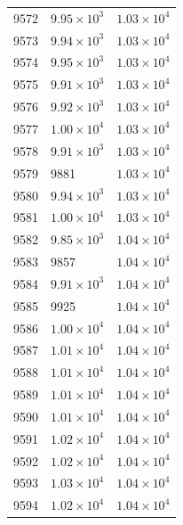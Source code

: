 \begin{table}[H]
\begin{tabular}{lll}
9572 & $\displaystyle 9.95 \times 10^{3}$ & $\displaystyle 1.03 \times 10^{4}$ \\
9573 & $\displaystyle 9.94 \times 10^{3}$ & $\displaystyle 1.03 \times 10^{4}$ \\
9574 & $\displaystyle 9.95 \times 10^{3}$ & $\displaystyle 1.03 \times 10^{4}$ \\
9575 & $\displaystyle 9.91 \times 10^{3}$ & $\displaystyle 1.03 \times 10^{4}$ \\
9576 & $\displaystyle 9.92 \times 10^{3}$ & $\displaystyle 1.03 \times 10^{4}$ \\
9577 & $\displaystyle 1.00 \times 10^{4}$ & $\displaystyle 1.03 \times 10^{4}$ \\
9578 & $\displaystyle 9.91 \times 10^{3}$ & $\displaystyle 1.03 \times 10^{4}$ \\
9579 & 9881 & $\displaystyle 1.03 \times 10^{4}$ \\
9580 & $\displaystyle 9.94 \times 10^{3}$ & $\displaystyle 1.03 \times 10^{4}$ \\
9581 & $\displaystyle 1.00 \times 10^{4}$ & $\displaystyle 1.03 \times 10^{4}$ \\
9582 & $\displaystyle 9.85 \times 10^{3}$ & $\displaystyle 1.04 \times 10^{4}$ \\
9583 & 9857 & $\displaystyle 1.04 \times 10^{4}$ \\
9584 & $\displaystyle 9.91 \times 10^{3}$ & $\displaystyle 1.04 \times 10^{4}$ \\
9585 & 9925 & $\displaystyle 1.04 \times 10^{4}$ \\
9586 & $\displaystyle 1.00 \times 10^{4}$ & $\displaystyle 1.04 \times 10^{4}$ \\
9587 & $\displaystyle 1.01 \times 10^{4}$ & $\displaystyle 1.04 \times 10^{4}$ \\
9588 & $\displaystyle 1.01 \times 10^{4}$ & $\displaystyle 1.04 \times 10^{4}$ \\
9589 & $\displaystyle 1.01 \times 10^{4}$ & $\displaystyle 1.04 \times 10^{4}$ \\
9590 & $\displaystyle 1.01 \times 10^{4}$ & $\displaystyle 1.04 \times 10^{4}$ \\
9591 & $\displaystyle 1.02 \times 10^{4}$ & $\displaystyle 1.04 \times 10^{4}$ \\
9592 & $\displaystyle 1.02 \times 10^{4}$ & $\displaystyle 1.04 \times 10^{4}$ \\
9593 & $\displaystyle 1.03 \times 10^{4}$ & $\displaystyle 1.04 \times 10^{4}$ \\
9594 & $\displaystyle 1.02 \times 10^{4}$ & $\displaystyle 1.04 \times 10^{4}$ \\

\end{tabular}
\end{table}
